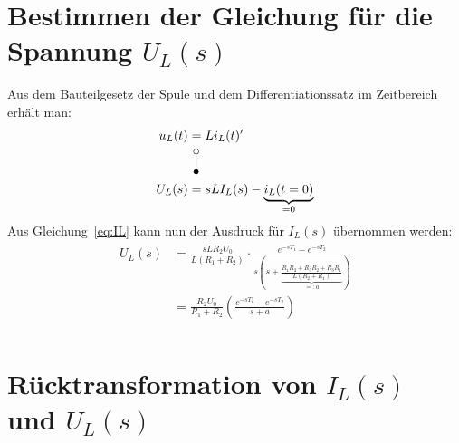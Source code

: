 \documentclass[11pt]{scrartcl}
\begin{document}
\section{Bestimmen der Gleichung für die Spannung $U_{L}(s)$}
Aus dem Bauteilgesetz der Spule und dem Differentiationssatz im Zeitbereich erhält man:
\begin{align}
  \begin{split}
    u_{L}(t) &= L i_{L}(t)' \\
    &\vLaplace \\
    U_{L}(s) &= sLI_{L}(s) - \underbrace{i_{L}(t=0)}_{=0}
  \end{split}
\end{align}
Aus Gleichung~\ref{eq:IL} kann nun der Ausdruck für $I_{L}(s)$ übernommen werden:
\begin{align}
  \begin{split}
    U_{L}(s) &= \frac{sLR_{2}U_{0}}{L(R_{1} + R_{2})} \cdot \frac{e^{-sT_{1}} - e^{-sT_{2}}}{s\left( s + \underbrace{\frac{R_{1}R_{2} + R_{3}R_{2} + R_{3}R_{1}}{L(R_{2} + R_{1})}}_{{=:a}}\right)} \\
    &= \frac{R_{2}U_{0}}{R_{1} + R_{2}}\left( \frac{e^{-sT_{1}} - e^{-sT_{2}}}{s + a}\right) \\
  \end{split}
\end{align}
\section{Rücktransformation von $I_{L}(s)$ und $U_{L}(s)$}
\end{document}
